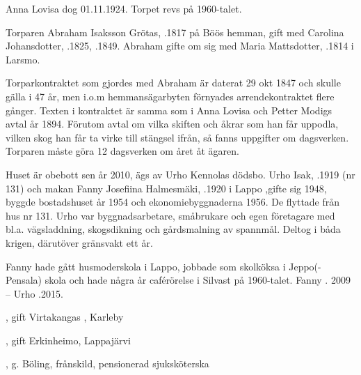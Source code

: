 Anna Lovisa dog 01.11.1924. Torpet revs på 1960-talet.


Torparen Abraham Isaksson Grötas, .1817 på Böös hemman, gift med Carolina Johansdotter, .1825, .1849. Abraham gifte om sig med Maria Mattsdotter, .1814 i Larsmo.
\begin{jhchildren}
  \item {}
  \item {}
  \item {}
\end{jhchildren}
Torparkontraktet som gjordes med Abraham är daterat 29 okt 1847 och skulle gälla i 47 år, men i.o.m hemmansägarbyten förnyades arrendekontraktet flere gånger. Texten i kontraktet är samma som i Anna Lovisa och Petter Modigs avtal år 1894. Förutom avtal om vilka skiften och åkrar som han får uppodla, vilken skog han får ta virke till stängsel ifrån, så fanns uppgifter om dagsverken. Torparen måste göra 12 dagsverken om året åt ägaren.




Huset är obebott sen år 2010, ägs av Urho Kennolas dödsbo. Urho Isak, .1919 (nr 131) och makan Fanny Josefiina Halmesmäki, .1920 i Lappo ,gifte sig 1948, byggde bostadshuset år 1954 och ekonomiebyggnaderna 1956. De flyttade från hus nr 131. Urho var byggnadsarbetare, småbrukare och egen företagare med bl.a. vägsladdning, skogsdikning och gårdsmalning av spannmål. Deltog i båda krigen, därutöver gränsvakt ett år.


Fanny hade gått husmoderskola i Lappo, jobbade som skolköksa i Jeppo(-Pensala) skola och hade några år caférörelse i Silvast på 1960-talet. Fanny . 2009  --  Urho .2015.
\begin{jhchildren}
  \item {}, gift Virtakangas , Karleby
  \item {}, gift Erkinheimo, Lappajärvi
  \item {}, g. Böling, frånskild, pensionerad sjuksköterska
\end{jhchildren}




